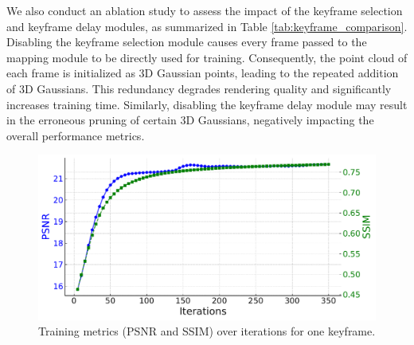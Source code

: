 \documentclass[lettersize,journal]{IEEEtran}
\begin{document}
We also conduct an ablation study to assess the impact of the keyframe selection and keyframe delay modules, as summarized in Table \ref{tab:keyframe_comparison}. Disabling the keyframe selection module causes every frame passed to the mapping module to be directly used for training. Consequently, the point cloud of each frame is initialized as 3D Gaussian points, leading to the repeated addition of 3D Gaussians. This redundancy degrades rendering quality and significantly increases training time. Similarly, disabling the keyframe delay module may result in the erroneous pruning of certain 3D Gaussians, negatively impacting the overall performance metrics.

\begin{figure}
    \centering
    \includegraphics[width=0.9\columnwidth]{image/runtime/runtimechart.pdf}
    \caption{Training metrics (PSNR and SSIM) over iterations for one keyframe.}
    \label{fig:psnrssim}
\end{figure}
\end{document}
